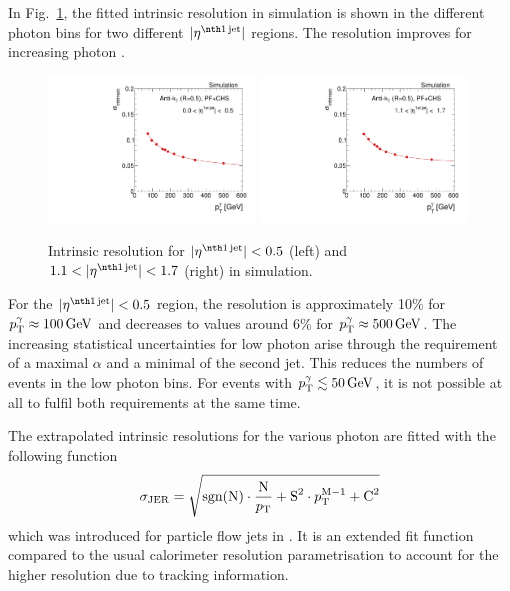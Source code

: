 In Fig.~\ref{fig:ResolutionOfPtgamma}, the fitted intrinsic resolution in simulation is shown in the different photon \pt bins for two different $|\etafirstjet|$ regions.
The resolution improves for increasing photon \pt. 
\begin{figure}[tbp]
  \centering
    \includegraphics[width=0.49\textwidth]{figures/resolution/methodology/Intrinsic_for_1_eta_bin_PFCHS_mc_RMS99.pdf}
    \includegraphics[width=0.49\textwidth]{figures/resolution/methodology/Intrinsic_for_3_eta_bin_PFCHS_mc_RMS99.pdf}
  \caption{Intrinsic resolution for $|\etafirstjet| < 0.5$ (left) and $1.1<|\etafirstjet| < 1.7$ (right) in simulation.}  
  \label{fig:ResolutionOfPtgamma}
\end{figure}
For the $|\etafirstjet|<0.5$ region, the resolution is approximately 10\% for $p_{\text{T}}^{\gamma} \approx 100\,\text{Ge}\kern-0.06667em\text{V}$ and decreases to values around 6\% for  
$p_{\text{T}}^{\gamma} \approx 500\,\text{Ge}\kern-0.06667em\text{V}$.
The increasing statistical uncertainties for low photon \pt arise through the requirement of a maximal $\alpha$ and a minimal \pt of the second jet. 
This reduces the numbers of events in the low photon \pt bins. 
For events with ${p}_\mathrm{T}^{\gamma} \lesssim 50\,\text{Ge}\kern-0.06667em\text{V}$, it is not possible at all to fulfil both requirements at the same time.

The extrapolated intrinsic resolutions for the various photon \pt are fitted with the following function
\begin{equation}
\label{eq:PFresolution}
\sigma_\mathrm{JER} = \sqrt{\text{sgn(N)} \cdot \frac{\text{N}}{p_{\text{T}}}  + \text{S}^2 \cdot p_{\text{T}}^{\text{M}-1} +  \text{C}^2 }
\end{equation}
which was introduced for particle flow jets in \cite{bib:CMS:JERCPaper_2011}.
It is an extended fit function compared to the usual calorimeter resolution parametrisation to account for the higher resolution due to tracking information. 

